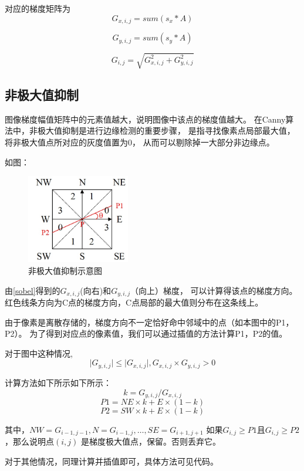 \documentclass{article}
\begin{document}
对应的梯度矩阵为
\[
G_{x, i,j} = sum\left( s_x * A \right)
\]

\[G_{y, i,j} = sum\left( s_y * A \right)
\]

\[G_{i,j} = \sqrt{G_{x, i,j}^2 + G_{y, i,j}^2}
\]

\subsection{非极大值抑制}

    图像梯度幅值矩阵中的元素值越大，说明图像中该点的梯度值越大。
    在Canny算法中，非极大值抑制是进行边缘检测的重要步骤，
    是指寻找像素点局部最大值，将非极大值点所对应的灰度值置为0，
    从而可以剔除掉一大部分非边缘点。

    如图：
\begin{figure}[h]
    \centering
    \includegraphics[width=0.4\textwidth]{./report/img}
    \caption{非极大值抑制示意图}
\end{figure}

    由\ref{sobel}得到的\(G_{x, i,j}\)(向右)和\(G_{y, i,j}\)（向上）梯度，
    可以计算得该点的梯度方向。
    红色线条方向为C点的梯度方向，C点局部的最大值则分布在这条线上。

    由于像素是离散存储的，梯度方向不一定恰好命中邻域中的点（如本图中的P1，P2）。
    为了得到对应点的像素值，我们可以通过插值的方法计算P1，P2的值。

    对于图中这种情况,
    \[\lvert G_{y, i,j} \rvert \leq \lvert G_{x, i,j}\rvert, G_{x, i,j}\times G_{y, i,j} > 0\]

    计算方法如下所示如下所示：
\[
    k = G_{y, i,j} / G_{x, i,j}
\]
\[
    P1 = NE \times k + E \times (1 - k)
\]
\[
    P2 = SW \times k + E \times (1 - k)
\]

    其中，\(NW = G_{i - 1, j - 1}, N = G_{i - 1, j}, \ldots, SE = G_{i + 1, j + 1}\)
    如果\(G_{i, j} \geq P1\)且\(G_{i, j} \geq P2\)，那么说明点\(\left( i, j \right)\)
    是梯度极大值点，保留。否则丢弃它。

    对于其他情况，同理计算并插值即可，具体方法可见代码。
\end{document}
